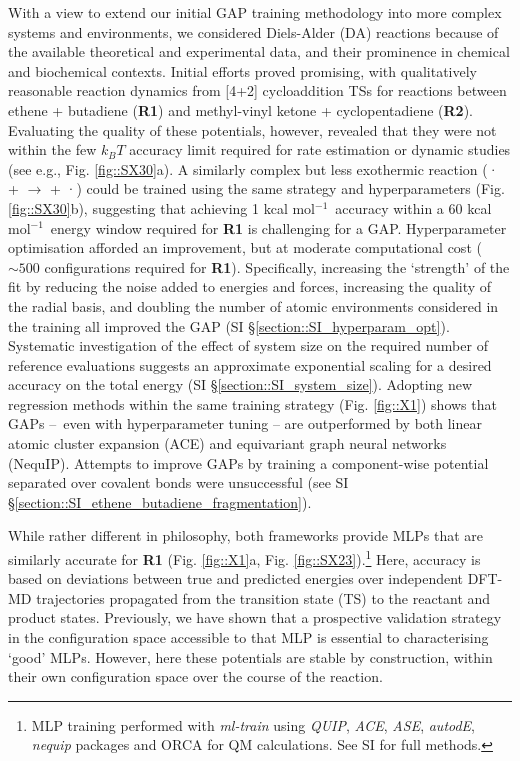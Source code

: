 \documentclass[twoside,twocolumn,9pt]{article}
\newcommand{\kcal}{kcal mol$^{-1}$}
\begin{document}
With a view to extend our initial GAP training methodology\cite{Young2021gap} into more complex systems and environments, we considered Diels-Alder (DA) reactions because of the available theoretical and experimental data,\cite{Black2012, Lording2020} and their prominence in chemical and biochemical contexts.\cite{Sato2021, MartCentelles2018, Briou2021} Initial efforts proved promising, with qualitatively reasonable reaction dynamics from [4+2] cycloaddition TSs for reactions between ethene + butadiene ({\bfseries{R1}}) and methyl-vinyl ketone + cyclopentadiene ({\bfseries{R2}}). Evaluating the quality of these potentials, however, revealed that they were not within the few $k_BT$ accuracy limit required for rate estimation or dynamic studies (see e.g., Fig. {\ref{fig::SX30}}a). A similarly complex but less exothermic reaction ({· +  $\rightarrow$  + ·}) could be trained using the same strategy and hyperparameters (Fig. \ref{fig::SX30}b), suggesting that achieving 1 \kcal~accuracy within a 60 \kcal~energy window required for {\bfseries{R1}} is challenging for a GAP. Hyperparameter optimisation afforded an improvement, but at moderate computational cost ($\sim500$ configurations required for {\bfseries{R1}}). Specifically, increasing the `strength’ of the fit by reducing the noise added to energies and forces, increasing the quality of the radial basis, and doubling the number of atomic environments considered in the training all improved the GAP (SI §\ref{section::SI_hyperparam_opt}). Systematic investigation of the effect of system size on the required number of reference evaluations suggests an approximate exponential scaling for a desired accuracy on the total energy (SI §\ref{section::SI_system_size}). Adopting new regression methods within the same training strategy (Fig. \ref{fig::X1}) shows that GAPs – even with hyperparameter tuning – are outperformed by both linear atomic cluster expansion (ACE\cite{Drautz2019}) and equivariant graph neural networks (NequIP\cite{Batzner2021}). Attempts to improve GAPs by training a component-wise potential separated over covalent bonds were unsuccessful (see SI §\ref{section::SI_ethene_butadiene_fragmentation}).


While rather different in philosophy, both frameworks provide MLPs that are similarly accurate for {\bfseries{R1}} (Fig. \ref{fig::X1}a, Fig. \ref{fig::SX23}).\footnote[4]{MLP training performed with \emph{ml-train}\cite{Young2021mlt} using \emph{QUIP},\cite{Csanyi_libAtoms_QUIP_2021} \emph{ACE},\cite{Ortner_ACE} \emph{ASE},\cite{HjorthLarsen2017} \emph{autodE},\cite{autodE} \emph{nequip}\cite{nequip_github} packages and ORCA\cite{Neese2017} for QM calculations. See SI for full methods.} Here, accuracy is based on deviations between true and predicted energies over independent DFT-MD trajectories propagated from the transition state (TS) to the reactant and product states. Previously, we have shown that a prospective validation strategy in the configuration space accessible to that MLP is essential to characterising `good’ MLPs.\cite{Young2021gap} However, here these potentials are stable by construction, within their own configuration space over the course of the reaction.
\end{document}
